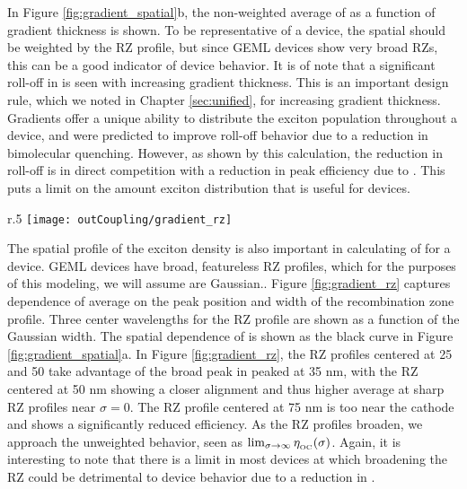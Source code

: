 \documentclass[../thesis.tex]{subfiles}
\begin{document}
In Figure \ref{fig:gradient_spatial}b, the non-weighted average of \oc as a function of gradient thickness is shown.  
To be representative of a device, the spatial \oc should be weighted by the RZ profile, but since GEML devices show very broad RZs, this can be a good indicator of device behavior.
It is of note that a significant roll-off in \oc is seen with increasing gradient thickness.  
This is an important design rule, which we noted in Chapter \ref{sec:unified}, for increasing gradient thickness.
Gradients offer a unique ability to distribute the exciton population throughout a device, and were predicted to improve roll-off behavior due to a reduction in bimolecular quenching.
However, as shown by this calculation, the reduction in roll-off is in direct competition with a reduction in peak efficiency due to \oc.
This puts a limit on the amount exciton distribution that is useful for devices.

\begin{wrapfigure}{r}{.5\textwidth}
\centering
\texttt{[image: outCoupling/gradient\_rz]}
\caption{Average \oc for a 100 nm GEML device, weighted to Gaussian recombination zones centered at 25, 50, and 75 nm as a function of the Gaussian width.}
\label{fig:gradient_rz}
\end{wrapfigure}

The spatial profile of the exciton density is also important in calculating of \oc for a device.
GEML devices have broad, featureless RZ profiles, which for the purposes of this modeling, we will assume are Gaussian.\supercite{Erickson2014}.
Figure \ref{fig:gradient_rz} captures dependence of average \oc on the peak position and width of the recombination zone profile.
Three center wavelengths for the RZ profile are shown as a function of the Gaussian width.
The spatial dependence of \oc is shown as the black curve in Figure \ref{fig:gradient_spatial}a.
In Figure \ref{fig:gradient_rz}, the RZ profiles centered at 25 and 50 take advantage of the broad peak in \oc peaked at 35 nm, with the RZ centered at 50 nm showing a closer alignment and thus higher average \oc at sharp RZ profiles near $\sigma=0$.  
The RZ profile centered at 75 nm is too near the cathode and shows a significantly reduced efficiency.
As the RZ profiles broaden, we approach the unweighted behavior, seen as $\lim_{\sigma\to\infty} \eta_{_\text{\tiny OC}}(\sigma)$.
Again, it is interesting to note that there is a limit in most devices at which broadening the RZ could be detrimental to device behavior due to a reduction in \oc.
\end{document}
